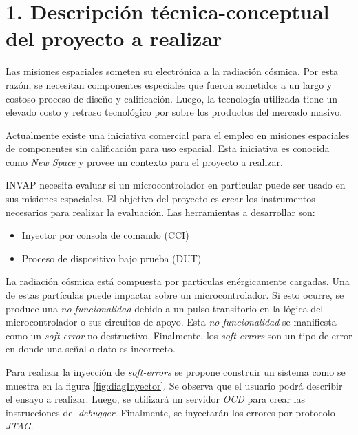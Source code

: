\documentclass[
11pt, %
]{charter}
\begin{document}
\section{1. Descripción técnica-conceptual del proyecto a realizar}
\label{sec:descripcion}

Las misiones espaciales someten su electrónica a la radiación cósmica.
Por esta razón, se necesitan componentes especiales que fueron sometidos a un largo y costoso proceso de diseño y calificación.
Luego, la tecnología utilizada tiene un elevado costo y retraso tecnológico por sobre los productos del mercado masivo.

Actualmente existe una iniciativa comercial para el empleo en misiones espaciales de componentes sin calificación para uso espacial.
Esta iniciativa es conocida como \emph{New Space} y provee un contexto para el proyecto a realizar.

INVAP necesita evaluar si un microcontrolador en particular puede ser usado en sus misiones espaciales.
El objetivo del proyecto es crear los instrumentos necesarios para realizar la evaluación.
Las herramientas a desarrollar son:

\begin{itemize}
	\item Inyector por consola de comando (CCI)
	\item Proceso de dispositivo bajo prueba (DUT)
\end{itemize}

La radiación cósmica está compuesta por partículas enérgicamente cargadas.
Una de estas partículas puede impactar sobre un microcontrolador.
Si esto ocurre, se produce una \emph{no funcionalidad} debido a un pulso transitorio en la lógica del microcontrolador o sus circuitos de apoyo.
Esta \emph{no funcionalidad} se manifiesta como un \emph{soft-error} no destructivo.
Finalmente, los \emph{soft-errors} son un tipo de error en donde una señal o dato es incorrecto.

Para realizar la inyección de \emph{soft-errors} se propone construir un sistema como se muestra en la figura \ref{fig:diagInyector}.
Se observa que el usuario podrá describir el ensayo a realizar.
Luego, se utilizará un servidor \emph{OCD} para crear las instrucciones del \emph{debugger}.
Finalmente, se inyectarán los errores por protocolo \emph{JTAG}.
\end{document}
